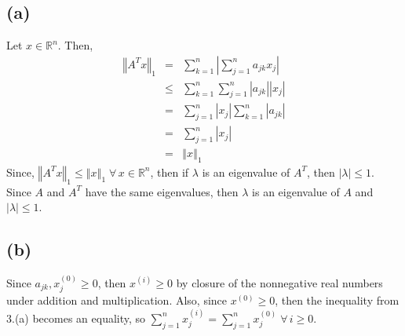 \documentclass[11pt]{article}
\newcommand{\R}{\ensuremath{\mathbb{R}}}
\theoremstyle{definition}
\theoremstyle{remark}
\newcommand{\newpart}{\vspace{-0.5\baselineskip}\hrulefill\vspace{-1.3\baselineskip}}
\theoremstyle{plain}
\begin{document}
\subsection*{(a)}
Let $x\in\R^n$. Then,
\begin{eqnarray*}
  \left\Vert A^Tx\right\Vert_1&=&\sum_{k=1}^n\left\vert\sum_{j=1}^na_{jk}x_j\right\vert\\
                           &\leq&\sum_{k=1}^n\sum_{j=1}^n\left\vert a_{jk}\right\vert\left\vert x_j\right\vert\\
                           &=&\sum_{j=1}^n\left\vert x_j\right\vert\sum_{k=1}^n\left\vert a_{jk}\right\vert\\
                           &=&\sum_{j=1}^n\left\vert x_j\right\vert\\
                           &=&\left\Vert x\right\Vert_1
\end{eqnarray*}
Since, $\left\Vert A^Tx\right\Vert_1\leq\left\Vert x\right\Vert_1\;\forall\, x\in\R^n$, then if $\lambda$ is an eigenvalue of $A^T$, then $\left\vert\lambda\right\vert\leq1$. Since $A$ and $A^T$ have the same eigenvalues, then $\lambda$ is an eigenvalue of $A$ and $\left\vert\lambda\right\vert\leq1$.

\newpart
\subsection*{(b)}
Since $a_{jk},x_j^{(0)}\geq0$, then $x^{(i)}\geq0$ by closure of the nonnegative real numbers under addition and multiplication. Also, since $x^{(0)}\geq0$, then the inequality from 3.(a) becomes an equality, so $\sum_{j=1}^nx_j^{(i)}=\sum_{j=1}^nx_j^{(0)}\;\forall\, i\geq0$.

\newpart
\end{document}

